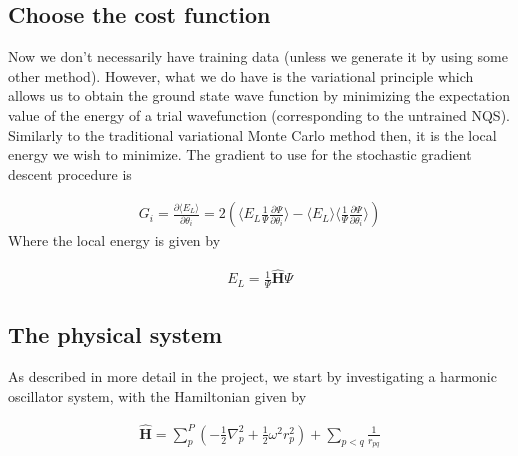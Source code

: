 \documentclass[norsk,a4paper,11pt]{article}
\begin{document}
\subsection{Choose the cost function}
Now we don't necessarily have training data (unless we generate it by using some other method). However, what we do have is the variational principle which allows us to obtain the ground state wave function by minimizing the expectation value of the energy of a trial wavefunction (corresponding to the untrained NQS). Similarly to the traditional variational Monte Carlo method then, it is the local energy we wish to minimize. The gradient to use for the stochastic gradient descent procedure is

\begin{align}
	G_i = \frac{\partial \langle E_L \rangle}{\partial \theta_i}
	= 2(\langle E_L \frac{1}{\Psi}\frac{\partial \Psi}{\partial \theta_i} \rangle - \langle E_L \rangle \langle \frac{1}{\Psi}\frac{\partial \Psi}{\partial \theta_i} \rangle )
\end{align}
Where the local energy is given by

\begin{align}
	E_L = \frac{1}{\Psi} \hat{\mathbf{H}} \Psi
\end{align}

\subsection{The physical system}
As described in more detail in the project, we start by investigating a harmonic oscillator system, with the Hamiltonian given by

\begin{align}
	\hat{\mathbf{H}} = \sum_p^P (-\frac{1}{2}\nabla_p^2 + \frac{1}{2}\omega^2 r_p^2 ) + \sum_{p<q} \frac{1}{r_{pq}}
\end{align}
\end{document}
